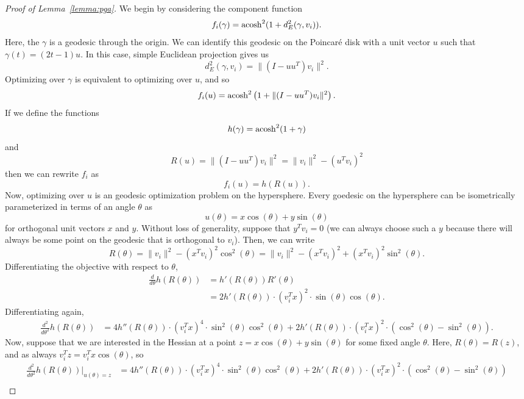 \begin{proof}[Proof of Lemma~\ref{lemma:pga}]
We begin by considering the component function
\[
  f_i(\gamma) = \operatorname{acosh}^2(1 + d_E^2(\gamma, v_i)).
\]
Here, the $\gamma$ is a geodesic through the origin.
We can identify this geodesic on the Poincar{\'e} disk with a unit vector $u$ such that $\gamma(t) = (2t-1) u$.
In this case, simple Euclidean projection gives us
\[
  d_E^2(\gamma, v_i) = \| (I - u u^T) v_i \|^2.
\]
Optimizing over $\gamma$ is equivalent to optimizing over $u$, and so
\[
  f_i(u) = \operatorname{acosh}^2\left(1 + \| (I - u u^T) v_i \|^2 \right).
\]
If we define the functions
\[
  h(\gamma) = \operatorname{acosh}^2(1 + \gamma)
\]
and
\[
  R(u) = \| (I - u u^T) v_i \|^2 =  \| v_i \|^2 - (u^T v_i)^2
\]
then we can rewrite $f_i$ as
\[
  f_i(u) = h(R(u)).
\]
Now, optimizing over $u$ is an geodesic optimization problem on the hypersphere.
Every goedesic on the hypersphere can be isometrically parameterized in terms of an angle $\theta$ as
\[
  u(\theta) = x \cos(\theta) + y \sin(\theta)
\]
for orthogonal unit vectors $x$ and $y$.
Without loss of generality, suppose that $y^T v_i = 0$ (we can always choose such a $y$ because there will always be some point on the geodesic that is orthogonal to $v_i$).
Then, we can write
\[
  R(\theta)
  =
  \| v_i \|^2 - (x^T v_i)^2 \cos^2(\theta)
  =
  \| v_i \|^2 - (x^T v_i)^2 + (x^T v_i)^2 \sin^2(\theta).
\]
Differentiating the objective with respect to $\theta$,
\begin{align*}
  \frac{d}{d \theta} h(R(\theta))
  &=
  h'(R(\theta)) R'(\theta) \\
  &=
  2 h'(R(\theta)) \cdot (v_i^T x)^2 \cdot \sin(\theta) \cos(\theta).
\end{align*}
Differentiating again,
\begin{align*}
  \frac{d^2}{d \theta^2} h(R(\theta))
  &=
  4 h''(R(\theta)) \cdot (v_i^T x)^4 \cdot \sin^2(\theta) \cos^2(\theta)
  +
  2 h'(R(\theta)) \cdot (v_i^T x)^2 \cdot \left( \cos^2(\theta) - \sin^2(\theta) \right).
\end{align*}
Now, suppose that we are interested in the Hessian at a point $z = x \cos(\theta) + y \sin(\theta)$ for some fixed angle $\theta$.
Here, $R(\theta) = R(z)$, and as always $v_i^T z = v_i^T x \cos(\theta)$, so
\begin{align*}
  \frac{d^2}{d \theta^2} h(R(\theta)) \big|_{u(\theta) = z}
  &=
  4 h''(R(\theta)) \cdot (v_i^T x)^4 \cdot \sin^2(\theta) \cos^2(\theta)
  +
  2 h'(R(\theta)) \cdot (v_i^T x)^2 \cdot \left( \cos^2(\theta) - \sin^2(\theta) \right) \\

\end{align*}
\end{proof}
